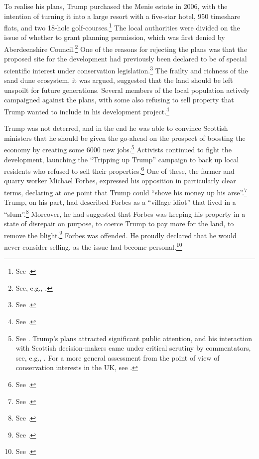 To realise his plans, Trump purchased the Menie estate in 2006, with the intention of turning it into a large resort with a five-star hotel, 950 timeshare flats, and two 18-hole golf-courses.\footnote{See \cite{siddique08}.} The local authorities were divided on the issue of whether to grant planning permission, which was first denied by Aberdeenshire Council.\footnote{See, e.g., \cite{bbc07}.} One of the reasons for rejecting the plans was that the proposed site for the development had previously been declared to be of special scientific interest under conservation legislation.\footnote{See \cite{bbc07b}.} The frailty and richness of the sand dune ecosystem, it was argued, suggested that the land should be left unspoilt for future generations. Several members of the local population actively campaigned against the plans, with some also refusing to sell property that Trump wanted to include in his development project.\footnote{See \cite{scotsman10}.}

Trump was not deterred, and in the end he was able to convince Scottish ministers that he should be given the go-ahead on the prospect of boosting the economy by creating some 6000 new jobs.\footnote{See \cite{carrell08}. Trump's plans attracted significant public attention, and his interaction with Scottish decision-makers came under critical scrutiny by commentators, see, e.g., \cite{jenkins08}. For a more general assessment from the point of view of conservation interests in the UK, see \cite{koen13}.} Activists continued to fight the development, launching the ``Tripping up Trump'' campaign to back up local residents who refused to sell their properties.\footnote{See \cite{tripping15}.} One of these, the farmer and quarry worker Michael Forbes, expressed his opposition in particularly clear terms, declaring at one point that Trump could ``shove his money up his arse''.\footnote{See \cite{scotsman10}.} Trump, on his part, had described Forbes as a ``village idiot'' that lived in a ``slum''.\footnote{See \cite{bbc10}.} Moreover, he had suggested that Forbes was keeping his property in a state of disrepair on purpose, to coerce Trump to pay more for the land, to remove the blight.\footnote{See \cite{cnn07}.} Forbes was offended. He proudly declared that he would never consider selling, as the issue had become personal.\footnote{See \cite{ferguson12}.}

